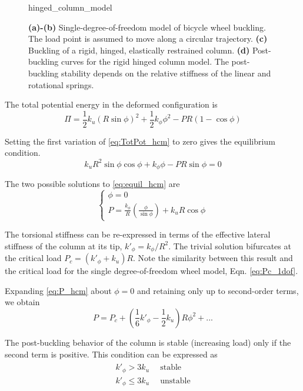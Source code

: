 \documentclass[\rootdir/thesis.tex]{subfiles}
\begin{document}
\begin{figure}[h]
\centering
{hinged_column_model}
\caption{\textbf{(a)-(b)} Single-degree-of-freedom model of bicycle wheel buckling. The load point is assumed to move along a circular trajectory. \textbf{(c)} Buckling of a rigid, hinged, elastically restrained column. \textbf{(d)} Post-buckling curves for the rigid hinged column model. The post-buckling stability depends on the relative stiffness of the linear and rotational springs.}
\label{fig:hinged_column_model}
\end{figure}

The total potential energy in the deformed configuration is
\begin{equation}
\label{eq:TotPot_hcm}
\Pi = \frac{1}{2}k_u(R\sin{\phi})^2 + \frac{1}{2}k_{\phi}\phi^2
    - PR(1-\cos{\phi})
\end{equation}

Setting the first variation of \eqref{eq:TotPot_hcm} to zero gives the equilibrium condition.
\begin{equation}
\label{eq:equil_hcm}
k_u R^2 \sin{\phi}\cos{\phi} + k_{\phi}\phi - PR\sin{\phi} = 0
\end{equation}

The two possible solutions to \eqref{eq:equil_hcm} are
\begin{equation}
\label{eq:P_hcm}
\begin{cases}
\phi = 0\\
P = \frac{k_{\phi}}{R}\left(\frac{\phi}{\sin{\phi}}\right) + k_u R\cos{\phi}
\end{cases}
\end{equation}

The torsional stiffness can be re-expressed in terms of the effective lateral stiffness of the column at its tip, $k'_{\phi}=k_{\phi}/R^2$. The trivial solution bifurcates at the critical load $P_c=(k'_{\phi} + k_u) R$. Note the similarity between this result and the critical load for the single degree-of-freedom wheel model, Eqn. \eqref{eq:Pc_1dof}.

Expanding \eqref{eq:P_hcm} about $\phi=0$ and retaining only up to second-order terms, we obtain
\begin{equation}
\label{eq:P_series_hcm}
P = P_c + \left(\frac{1}{6}k'_{\phi} - \frac{1}{2}k_u\right)R\phi^2 + ...
\end{equation}

The post-buckling behavior of the column is stable (increasing load) only if the second term is positive. This condition can be expressed as
\begin{align}
\begin{split}
\label{eq:pb_stability_hcm}
k'_{\phi} > 3k_u & \,\,\,\text{stable}\\
k'_{\phi} \leq 3k_u & \,\,\,\text{unstable}
\end{split}
\end{align}
\end{document}

